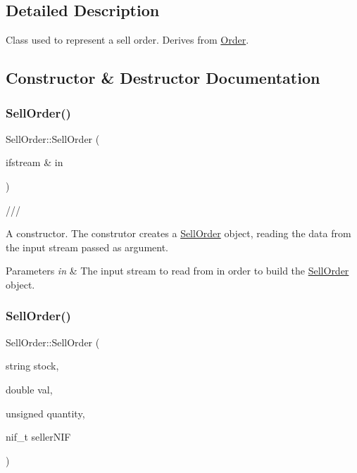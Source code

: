 \subsection{Detailed Description}
Class used to represent a sell order. Derives from \hyperlink{class_order}{Order}. 

\subsection{Constructor \& Destructor Documentation}
\hypertarget{class_sell_order_ac89fdde112f2f9aac52633a2d9507bea}{}\label{class_sell_order_ac89fdde112f2f9aac52633a2d9507bea} 
\subsubsection{\texorpdfstring{Sell\+Order()}{SellOrder()}\hspace{0.1cm}{\footnotesize\ttfamily [1/2]}}
{\footnotesize\ttfamily Sell\+Order\+::\+Sell\+Order (\begin{DoxyParamCaption}\item[{ifstream \&}]{in }\end{DoxyParamCaption})}



/// 

A constructor. The construtor creates a \hyperlink{class_sell_order}{Sell\+Order} object, reading the data from the input stream passed as argument. 
\begin{DoxyParams}{Parameters}
{\em in} & The input stream to read from in order to build the \hyperlink{class_sell_order}{Sell\+Order} object. \\
\hline
\end{DoxyParams}
\hypertarget{class_sell_order_a19145616a9cceec182bdcb00816b89c5}{}\label{class_sell_order_a19145616a9cceec182bdcb00816b89c5} 
\subsubsection{\texorpdfstring{Sell\+Order()}{SellOrder()}\hspace{0.1cm}{\footnotesize\ttfamily [2/2]}}
{\footnotesize\ttfamily Sell\+Order\+::\+Sell\+Order (\begin{DoxyParamCaption}\item[{string}]{stock,  }\item[{double}]{val,  }\item[{unsigned}]{quantity,  }\item[{nif\+\_\+t}]{seller\+N\+IF }\end{DoxyParamCaption})}

